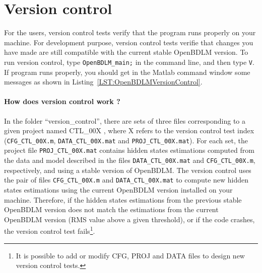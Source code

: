 \section{Version control}
\label{S:VERSIONCONTROL}

For the users, version control tests verify that the program runs properly on your machine. 
For development purpose, version control tests verifie that changes you have made are still compatible with the current stable OpenBDLM version. 
To run version control, type \colorbox{light-gray}{\lstinline[basicstyle = \mlttfamily \small, backgroundcolor = \color{light-gray}]!OpenBDLM_main;!} in the \MATLAB{} command line, and then type \colorbox{light-gray}{\lstinline[basicstyle = \mlttfamily \small, backgroundcolor = \color{light-gray}]!V!}. 
If program runs properly, you should get in the Matlab command window some messages as shown in Listing~\ref{LST:OpenBDLMVersionControl}.

\paragraph{How does version control work ?}
In the folder ``version\_control'', there are sets of three files corresponding to a given project named CTL\_00X , where X refers to the version control test index (\lstinline[basicstyle = \mlttfamily \small, backgroundcolor = \color{light-gray}]!CFG_CTL_00X.m!, \lstinline[basicstyle = \mlttfamily \small, backgroundcolor = \color{light-gray}]!DATA_CTL_00X.mat! and \lstinline[basicstyle = \mlttfamily \small, backgroundcolor = \color{light-gray}]!PROJ_CTL_00X.mat!).
For each set, the project file \lstinline[basicstyle = \mlttfamily \small, backgroundcolor = \color{light-gray}]!PROJ_CTL_00X.mat! contains hidden states estimations computed from the data and model described in the files \lstinline[basicstyle = \mlttfamily \small, backgroundcolor = \color{light-gray}]!DATA_CTL_00X.mat! and \lstinline[basicstyle = \mlttfamily \small, backgroundcolor = \color{light-gray}]!CFG_CTL_00X.m!, respectively, and using a stable version of OpenBDLM.
The version control uses the pair of files \lstinline[basicstyle = \mlttfamily \small, backgroundcolor = \color{light-gray}]!CFG_CTL_00X.m! and \lstinline[basicstyle = \mlttfamily \small, backgroundcolor = \color{light-gray}]!DATA_CTL_00X.mat! to compute new hidden states estimations using the current  OpenBDLM version installed on your machine.
Therefore, if the hidden states estimations from the previous stable OpenBDLM version does not match the estimations from the current OpenBDLM version (RMS value above a given threshold), or if the code crashes, the version control test fails\footnote{It is possible to add or modify CFG, PROJ and DATA files to design new version control tests.}.

